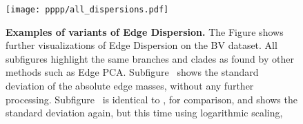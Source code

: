 
\begin{figure}[!htpb]
    \centering
    \texttt{[image: pppp/all\_dispersions.pdf]}
    \begin{subfigure}{0pt}
        \label{fig:all_dispersions:sub:em_var}
    \end{subfigure}
    \begin{subfigure}{0pt}
        \label{fig:all_dispersions:sub:em_varc}
    \end{subfigure}
    \begin{subfigure}{0pt}
        \label{fig:all_dispersions:sub:em_iod}
    \end{subfigure}
    \begin{subfigure}{0pt}
        \label{fig:all_dispersions:sub:ei_var}
    \end{subfigure}
    \caption[Examples of variants of Edge Dispersion]{
        \textbf{Examples of variants of Edge Dispersion.}
        The Figure shows further visualizations of Edge Dispersion on the \ac{BV} dataset.
        All subfigures highlight the same branches and clades as found by other methods such as Edge PCA.
        Subfigure~
        shows the standard deviation of the absolute edge masses, without any further processing.
        Subfigure~
        is identical to , for comparison,
        and shows the standard deviation again, but this time using logarithmic scaling,
}
\end{figure}
